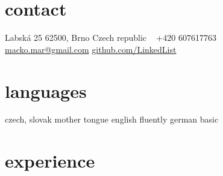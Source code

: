\documentclass['print']{friggeri-cv} %
\begin{document}


\begin{aside} %
\section{contact}
Labská 25
62500, Brno
Czech republic
~
+420 607617763
~
\href{mailto:macko.mar@gmail.com}{macko.mar@gmail.com}
\href{https://github.com/LinkedList}{github.com/LinkedList}
\section{languages}
czech, slovak mother tongue
english fluently
german basic
\end{aside}


\section{experience}
\end{document}
